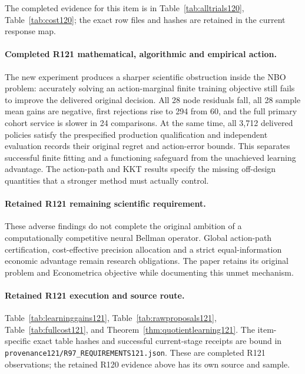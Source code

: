 The completed evidence for this item is in Table~\ref{tab:alltrials120}, Table~\ref{tab:cost120}; the exact row files and hashes are retained in the current response map.

\paragraph{Completed R121 mathematical, algorithmic and empirical action.}
The new experiment produces a sharper scientific obstruction inside the NBO problem: accurately solving an action-marginal finite training objective still fails to improve the delivered original decision. All 28 node residuals fall, all 28 sample mean gains are negative, first rejections rise to 294 from 60, and the full primary cohort service is slower in 24 comparisons. At the same time, all 3,712 delivered policies satisfy the prespecified production qualification and independent evaluation records their original regret and action-error bounds. This separates successful finite fitting and a functioning safeguard from the unachieved learning advantage. The action-path and KKT results specify the missing off-design quantities that a stronger method must actually control.

\paragraph{Retained R121 remaining scientific requirement.}
These adverse findings do not complete the original ambition of a computationally competitive neural Bellman operator. Global action-path certification, cost-effective precision allocation and a strict equal-information economic advantage remain research obligations. The paper retains its original problem and Econometrica objective while documenting this unmet mechanism.

\paragraph{Retained R121 execution and source route.}
Table~\ref{tab:learninggains121}, Table~\ref{tab:rawproposals121}, Table~\ref{tab:fullcost121}, and Theorem~\ref{thm:quotientlearning121}.
The item-specific exact table hashes and successful current-stage receipts are bound in \nolinkurl{provenance121/R97_REQUIREMENTS121.json}. These are completed R121 observations; the retained R120 evidence above has its own source and sample.
